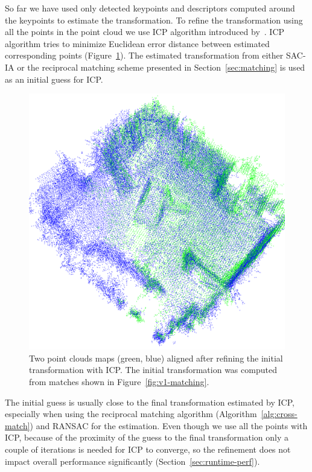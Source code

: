 So far we have used only detected keypoints and descriptors computed around the keypoints to estimate the transformation. To refine the transformation using all the points in the point cloud we use \gls{ICP} algorithm introduced by~\citet{besl1992icp}. \gls{ICP} algorithm tries to minimize Euclidean error distance between estimated corresponding points (Figure~\ref{fig:v1-refined}). The estimated transformation from either \gls{SAC-IA} or the reciprocal matching scheme presented in Section~\ref{sec:matching} is used as an initial guess for \gls{ICP}.

\begin{figure}
    \centering
    \includegraphics[width=\textwidth]{../img/v1-refined.png}
    \caption[Aligned point clouds]{Two point clouds maps (green, blue) aligned after refining the initial transformation with \gls{ICP}. The initial transformation was computed from matches shown in Figure~\ref{fig:v1-matching}.}
    \label{fig:v1-refined}
\end{figure}

The initial guess is usually close to the final transformation estimated by \gls{ICP}, especially when using the reciprocal matching algorithm (Algorithm~\ref{alg:cross-match}) and \gls{RANSAC} for the estimation. Even though we use all the points with \gls{ICP}, because of the proximity of the guess to the final transformation only a couple of iterations is needed for \gls{ICP} to converge, so the refinement does not impact overall performance significantly (Section~\ref{sec:runtime-perf}).

